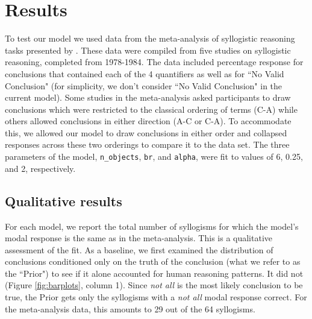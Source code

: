 \documentclass[10pt,letterpaper]{article}
\begin{document}
\section{Results}

To test our model we used data from the meta-analysis of syllogistic reasoning tasks presented by . These data were compiled from five studies on syllogistic reasoning, completed from 1978-1984. The data included percentage response for conclusions that contained each of the 4 quantifiers as well as for ``No Valid Conclusion" (for simplicity, we don't consider ``No Valid Conclusion" in the current model). Some studies in the meta-analysis asked participants to draw conclusions which were restricted to the classical ordering of terms (C-A) while others allowed conclusions in either direction (A-C or C-A). To accommodate this, we allowed our model to draw conclusions in either order and collapsed responses across these two orderings to compare it to the data set.
%
The three parameters of the model, \lstinline{n_objects}, \lstinline{br}, and \lstinline{alpha}, were fit to values of 6, 0.25, and 2, respectively.

\subsection{Qualitative results}
For each model, we report the total number of syllogisms for which the model's modal response is the same as in the meta-analysis. This is a qualitative assessment of the fit. 
As a baseline, we first examined the distribution of conclusions conditioned only on the truth of the conclusion (what we refer to as the ``Prior") to see if it alone accounted for human reasoning patterns. It did not (Figure \ref{fig:barplots}, column 1). Since \emph{not all} is the most likely conclusion to be true, the Prior gets only the syllogisms with a \emph{not all} modal response correct. For the meta-analysis data, this amounts to 29 out of the 64 syllogisms.
\end{document}

